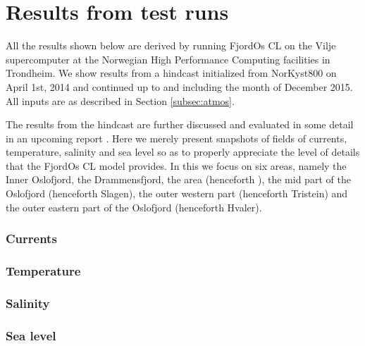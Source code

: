 \section{Results from test runs}
\label{sec:resul}
All the results shown below are derived by running FjordOs CL on the Vilje supercomputer at the Norwegian High Performance Computing facilities in Trondheim. We show results from a hindcast initialized from NorKyst800 on April 1st, 2014 and continued up to and including the month of December 2015. 
All inputs are as described in Section \ref{subsec:atmos}.
 
The results from the hindcast are further discussed and evaluated in some detail in an upcoming report \citep{hjelm:etal:2016}. Here we merely present snapshots of fields of currents, temperature, salinity and sea level so as to properly appreciate the level of details that the FjordOs CL model provides. In this we focus on six areas, namely the Inner Oslofjord, the Drammensfjord, the {\DR} area (henceforth {\DR}), the mid part of the Oslofjord (henceforth Slagen), the outer western part (henceforth Tristein) and the outer eastern part of the Oslofjord (henceforth Hvaler). 

\subsubsection{Currents}
   
   
   
   
   
   

\subsubsection{Temperature}
   

\subsubsection{Salinity}
   

\subsubsection{Sea level}
   
